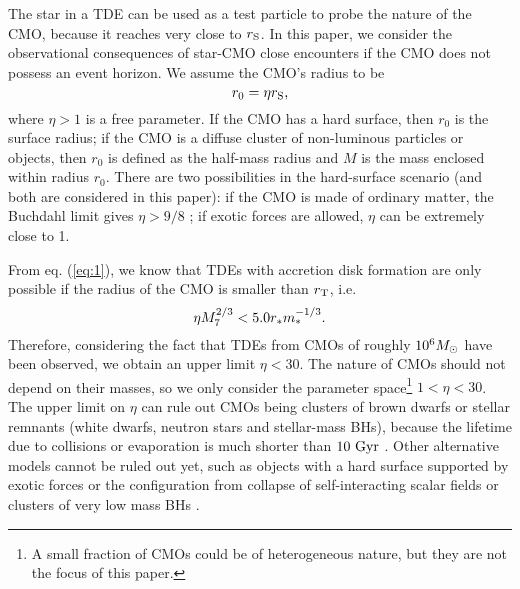 \documentclass[useAMS,usenatbib]{mn2e}
\begin{document}
The star in a TDE can be used as a test particle to probe the
nature of the CMO, because it reaches very close to $r_{\rm S}$. In
this paper, we consider the observational consequences 
of star-CMO close encounters if the CMO does not possess an event
horizon. We assume the CMO's radius to be
\begin{equation}
  \label{eq:9}
  r_0=\eta r_{\rm S},
\end{equation}
where $\eta>1$ is a free parameter. If the CMO has a hard surface,
then $r_0$ is the surface radius; if the CMO is a diffuse cluster of
non-luminous particles or objects, then $r_0$ is defined as the
half-mass radius and $M$ is the mass enclosed within radius
$r_0$. There are two possibilities in the hard-surface scenario (and both
are considered in this paper): if
the CMO is made of ordinary matter, the Buchdahl limit gives
$\eta>9/8$ \citep{Buchdahl59}; if exotic forces are allowed,
$\eta$ can be extremely close to 1.

From eq. (\ref{eq:1}), we know that TDEs with accretion disk formation
are only possible if the radius of the CMO is smaller than $r_{\rm T}$, i.e.
\begin{equation}
  \label{eq:25}
  \eta M_7^{2/3} < 5.0  r_{\rm *} m_{\rm *}^{-1/3}.
\end{equation}
Therefore, considering the fact that TDEs from CMOs of roughly
$10^6M_{\rm \odot}$ have been observed, we obtain an upper
limit $\eta < 30$. The nature
of CMOs should not depend on their 
masses, so we only consider the parameter space\footnote{A small
  fraction of CMOs could be of heterogeneous nature, but they are not
  the focus of this paper.} $1<\eta < 30$. The upper limit on $\eta$ can rule out
CMOs being clusters of brown dwarfs or stellar remnants (white
dwarfs, neutron stars and stellar-mass BHs), because the
lifetime due to collisions or evaporation is much shorter than $10\rm\
Gyr$ \citep{1998ApJ...494L.181M}. Other alternative models cannot be
ruled out yet, such as objects with a hard surface supported by exotic
forces \citep[e.g. gravastars,][]{2004PNAS..101.9545M} or the
configuration from collapse of self-interacting scalar fields 
\citep[boson stars, see the review
  by][]{2003CQGra..20R.301S} or clusters of very low mass BHs
  \citep[$\lesssim 10^{-6} M_7^2 (\eta/30)^{3/2} M_{\rm \odot}$ if we
  use the Newtonian evaporation rate of][]{1998ApJ...494L.181M}. 
\end{document}
